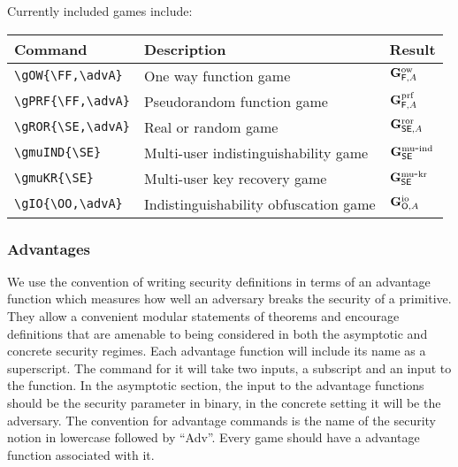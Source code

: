 \documentclass[11pt,twoside]{report}
\begin{document}
Currently included games include:
\begin{center}
\begin{tabular}{l l l}
	\textbf{Command} & \textbf{Description} & \textbf{Result} \\\hline
	\lstinline$\gOW{\FF,\advA}$ & One way function game & $\mathbf{G}^{\rm ow}_{\mathsf{F},A}$  \\
	\lstinline$\gPRF{\FF,\advA}$ & Pseudorandom function game & $\mathbf{G}^{\rm prf}_{\mathsf{F},A}$  \\
	\lstinline$\gROR{\SE,\advA}$ & Real or random game & $\mathbf{G}^{\rm ror}_{\mathsf{SE},A}$  \\
	\lstinline$\gmuIND{\SE}$ & Multi-user indistinguishability game & $\mathbf{G}^{\rm mu\mbox{-}ind}_{\mathsf{SE}}$  \\
	\lstinline$\gmuKR{\SE}$ & Multi-user key recovery game & $\mathbf{G}^{\rm mu\mbox{-}kr}_{\mathsf{SE}}$  \\
	\lstinline$\gIO{\OO,\advA}$ & Indistinguishability obfuscation game & $\mathbf{G}^{\rm io}_{\mathsf{O},A}$
\end{tabular}
\end{center}


\subsubsection{Advantages}
We use the convention of writing security definitions in terms of an advantage function which measures how well an adversary breaks the security of a primitive.
They allow a convenient modular statements of theorems and encourage definitions that are amenable to being considered in both the asymptotic and concrete security regimes.
Each advantage function will include its name as a superscript.
The command for it will take two inputs, a subscript and an input to the function.
In the asymptotic section, the input to the advantage functions should be the security parameter in binary, in the concrete setting it will be the adversary. 
The convention for advantage commands is the name of the security notion in lowercase followed by ``Adv''.
Every game should have a advantage function associated with it.
\end{document}
